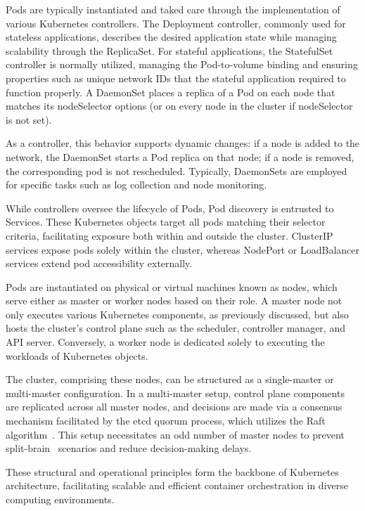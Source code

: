 Pods are typically instantiated and taked care through the implementation of various Kubernetes controllers. The Deployment controller, commonly used for stateless applications, describes the desired application state while managing scalability through the ReplicaSet. For stateful applications, the StatefulSet controller is normally utilized, managing the Pod-to-volume binding and ensuring properties such as unique network IDs that the stateful application required to function properly. A DaemonSet places a replica of a Pod on each node that matches its nodeSelector options (or on every node in the cluster if nodeSelector is not set). 

As a controller, this behavior supports dynamic changes: if a node is added to the network, the DaemonSet starts a Pod replica on that node; if a node is removed, the corresponding pod is not rescheduled. Typically, DaemonSets are employed for specific tasks such as log collection and node monitoring.

While controllers oversee the lifecycle of Pods, Pod discovery is entrusted to Services. These Kubernetes objects target all pods matching their selector criteria, facilitating exposure both within and outside the cluster. ClusterIP services expose pods solely within the cluster, whereas NodePort or LoadBalancer services extend pod accessibility externally.

Pods are instantiated on physical or virtual machines known as nodes, which serve either as master or worker nodes based on their role. A master node not only executes various Kubernetes components, as previously discussed, but also hosts the cluster's control plane such as the scheduler, controller manager, and API server. Conversely, a worker node is dedicated solely to executing the workloads of Kubernetes objects.

The cluster, comprising these nodes, can be structured as a single-master or multi-master configuration. In a multi-master setup, control plane components are replicated across all master nodes, and decisions are made via a consensus mechanism facilitated by the etcd quorum process, which utilizes the Raft algorithm~\cite{k1-1}.  This setup necessitates an odd number of master nodes to prevent split-brain~\cite{k1-2} scenarios and reduce decision-making delays. 

These structural and operational principles form the backbone of Kubernetes architecture, facilitating scalable and efficient container orchestration in diverse computing environments.


